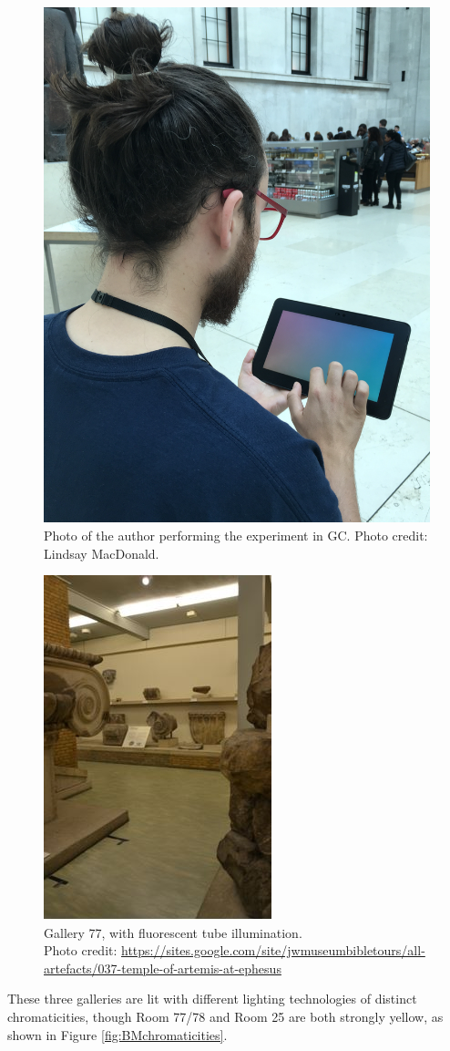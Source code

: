 \begin{figure}[hbtp]
\includegraphics[max width=\textwidth,max height=0.7\textwidth]{figs/tablet/BM_GC.jpg}
\caption{Photo of the author performing the experiment in GC. Photo credit: Lindsay MacDonald.}
\label{fig:BM_GC}
\end{figure}

\begin{figure}[hbtp]
\includegraphics[max width=\textwidth,max height=0.7\textwidth]{figs/tablet/BM77.jpg}
\caption{Gallery 77, with fluorescent tube illumination. \\ Photo credit: \url{https://sites.google.com/site/jwmuseumbibletours/all-artefacts/037-temple-of-artemis-at-ephesus}}
\label{fig:BM77}
\end{figure}

These three galleries are lit with different lighting technologies of distinct chromaticities, though Room 77/78 and Room 25 are both strongly yellow, as shown in Figure \ref{fig:BMchromaticities}.

